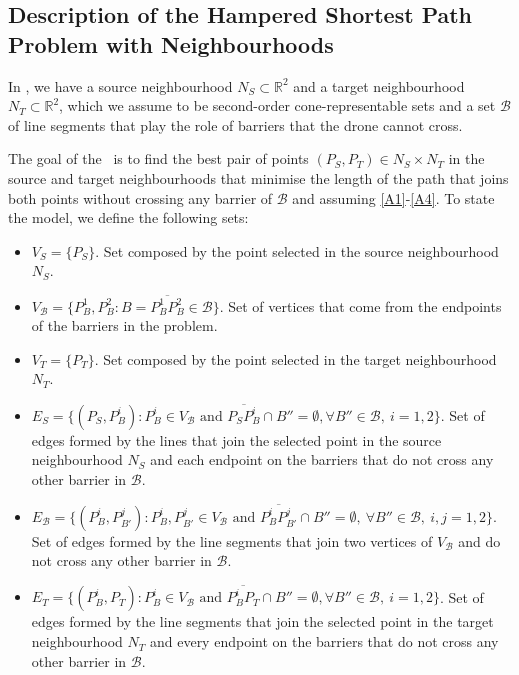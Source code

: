 \documentclass[a4paper,  review, authoryear, 1p., doubleblind]{elsarticle}
\newcommand{\SPPN}{{\sf{H-SPPN}\xspace }}
\newcommand{\B}{{\mathcal B}}
\newcommand{\VB}{{V^{}_{\mathcal B}}}
\newcommand{\EB}{{E^{}_{\mathcal B}}}
\newcommand{\VS}{{V^{}_{S}}}
\newcommand{\ES}{{E^{}_{S}}}
\newcommand{\VT}{{V^{}_{T}}}
\newcommand{\ET}{{E^{}_{T}}}
\begin{document}
	
	\subsection{Description of the Hampered Shortest Path Problem with Neighbourhoods}\label{subsection:descriptionHSPPN}
	In \SPPN, we have a source neighbourhood $N_S\subset\mathbb R^2$ and a target neighbourhood $N_T\subset\mathbb R^2$, which we assume to be second-order cone-representable sets and a set $\mathcal B$ of line segments that play the role of barriers that the drone cannot cross. 
	
	The goal of the \SPPN \ is to find the best pair of points $(P_{S}, P_{T})\in N_S\times N_T$ in the source and target neighbourhoods that minimise the length of the path that joins both points without crossing any barrier of $\mathcal B$ and assuming \ref{A1}-\ref{A4}. To state the model,  we define the following sets:
	\begin{itemize}
		\item $\VS=\{P_S\}$. Set composed by the point selected in the source neighbourhood $N_S$.
		\item $\VB=\{P^1_B, P^2_B:B=\overline{P^1_B P^2_B}\in \mathcal B\}$. Set of vertices that come from the endpoints of the barriers in the problem.
		\item $\VT=\{P^{}_T\}$. Set composed by the point selected in the target neighbourhood $N_T$.
		\item $\ES=\{(P_S, P^i_{B}):P^i_B\in V_\B\text{ and } \overline{P_SP^i_B}\cap B''=\emptyset,\forall B''\in\B,\:i=1,2\}$. Set of edges formed by the lines that join the selected point in the source neighbourhood $N_S$ and each endpoint on the barriers that do not cross any other barrier in $\B$.
		\item $\EB=\{(P^{i}_B, P^{j}_{B'}):P^i_B, P^j_{B'}\in \VB \text{ and } \overline{P^i_B P^j_{B'}}\cap B''=\emptyset,\:\forall B''\in\mathcal B,\:i, j=1,2\}$. Set of edges formed by the line segments that join two vertices of $V_{\mathcal B}$ and do not cross any other barrier in $\B$.
		\item $\ET=\{(P^i_{B}, P^{}_T):P^i_B\in V_\B\text{ and } \overline{P^i_BP^{}_T}\cap B''=\emptyset,\forall B''\in\B,\:i=1,2\}$. Set of edges formed by the line segments that join the selected point in the target neighbourhood $N_T$ and every endpoint on the barriers that do not cross any other barrier in $\B$.
	\end{itemize} 
	
\end{document}
